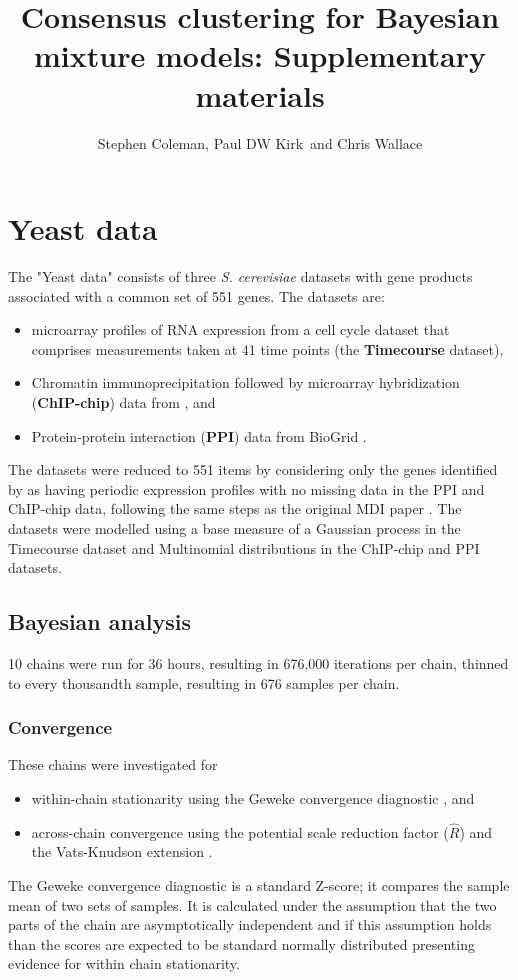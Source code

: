 \documentclass[]{article}
\title{Consensus clustering for Bayesian mixture models: Supplementary materials}
\author{Stephen Coleman, Paul DW Kirk\, and Chris Wallace}
\begin{document}
\maketitle

\begin{abstract}

\end{abstract}

\section{Yeast data}

The "Yeast data" consists of three \emph{S. cerevisiae} datasets with gene products associated with a common set of 551 genes. The datasets are:
\begin{itemize}
	\item microarray profiles of RNA expression from \cite{granovskaia2010high} a cell cycle dataset that comprises measurements taken at 41 time points (the \textbf{Timecourse} dataset),
	\item Chromatin immunoprecipitation followed by microarray hybridization (\textbf{ChIP-chip}) data from \cite{harbison2004transcriptional}, and
	\item Protein-protein interaction (\textbf{PPI}) data from BioGrid \citep{stark2006biogrid}.
\end{itemize}
The datasets were reduced to 551 items by considering only the genes identified by \cite{granovskaia2010high} as having periodic expression profiles with no missing data in the PPI and ChIP-chip data, following the same steps as the original MDI paper \citep{kirk2012bayesian}. The datasets were modelled using a base measure of a Gaussian process in the Timecourse dataset and Multinomial distributions in the ChIP-chip and PPI datasets.


\subsection{Bayesian analysis}
10 chains were run for 36 hours, resulting in 676,000 iterations per chain, thinned to every thousandth sample, resulting in 676 samples per chain. 

\subsubsection{Convergence}
These chains were investigated for 
\begin{itemize}
	\item within-chain stationarity using the Geweke convergence diagnostic \citep{geweke1991evaluating}, and
	\item across-chain convergence using the potential scale reduction factor ($\hat{R}$) and the Vats-Knudson extension \citep[\emph{stable $\hat{R}$},][]{vats2018revisiting}.
\end{itemize}
The Geweke convergence diagnostic is a standard Z-score; it compares the sample mean of two sets of samples. It is calculated under the assumption that the two parts of the chain are asymptotically independent and if this assumption holds than the scores are expected to be standard normally distributed presenting evidence for within chain stationarity.
\end{document}
